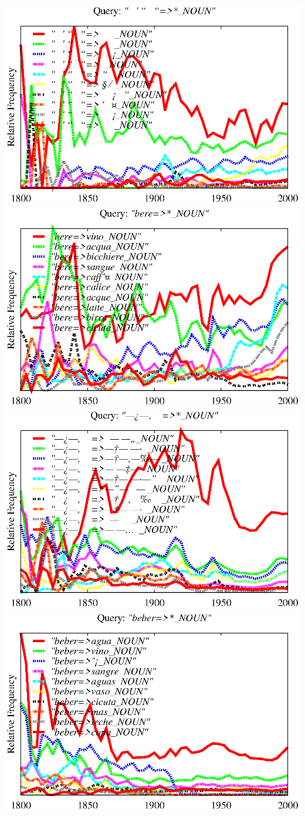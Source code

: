 \documentclass[11pt]{article}
\begin{document}
{\includegraphics[width=.48\textwidth]{graphs/drink_HEB}
\includegraphics[width=.48\textwidth]{graphs/drink_ITA}
\includegraphics[width=.48\textwidth]{graphs/drink_RUS}
\includegraphics[width=.48\textwidth]{graphs/drink_SPA}}
\end{document}
